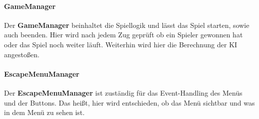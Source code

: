 \paragraph{GameManager}
Der \textbf{GameManager} beinhaltet die Spiellogik und lässt das Spiel starten, sowie auch beenden. Hier wird nach jedem Zug geprüft ob ein Spieler gewonnen hat oder das Spiel noch weiter läuft. Weiterhin wird hier die Berechnung der KI angestoßen.
\paragraph{EscapeMenuManager}
Der \textbf{EscapeMenuManager} ist zuständig für das Event-Handling des Menüs und der Buttons. Das heißt, hier wird entschieden, ob das Menü sichtbar und was in dem Menü zu sehen ist.

